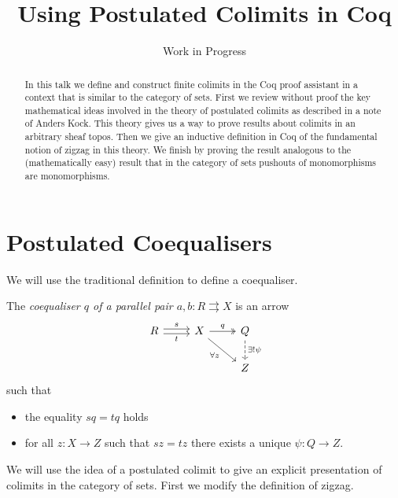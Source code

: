 \documentclass{article}
\title{Using Postulated Colimits in Coq}
\author{Work in Progress}
\begin{document}
\maketitle
\begin{abstract}
  In this talk we define and construct finite colimits in the Coq proof assistant in a context that is similar to the category of sets. First we review without proof the key mathematical ideas involved in the theory of postulated colimits as described in a note of Anders Kock. This theory gives us a way to prove results about colimits in an arbitrary sheaf topos. Then we give an inductive definition in Coq of the fundamental notion of zigzag in this theory. We finish by proving the result analogous to the (mathematically easy) result that in the category of sets pushouts of monomorphisms are monomorphisms.
\end{abstract}
\tableofcontents

\section{Postulated Coequalisers}
\label{sec:postulated-coequalisers}

We will use the traditional definition to define a coequaliser.

\begin{definition}\label{def:coequaliser}
  The \emph{coequaliser $q$ of a parallel pair $a,b:R \rightrightarrows X$} is an arrow
    \begin{equation*}
      \begin{tikzcd}
       R \rar[yshift=0.5ex]{s} \rar[yshift=-0.5ex][swap]{t} & X \drar[swap]{\forall z} \rar[twoheadrightarrow]{q} & Q \dar[dashed]{\exists !\psi}\\
        & {} & Z
      \end{tikzcd}
    \end{equation*}
    such that
    \begin{itemize}
    \item the equality $sq=tq$ holds
    \item for all $z:X \rightarrow Z$ such that $sz=tz$ there exists a unique $\psi:Q \rightarrow Z$.
    \end{itemize}
\end{definition}

We will use the idea of a postulated colimit to give an explicit presentation of colimits in the category of sets.
First we modify the definition of zigzag.
\end{document}
